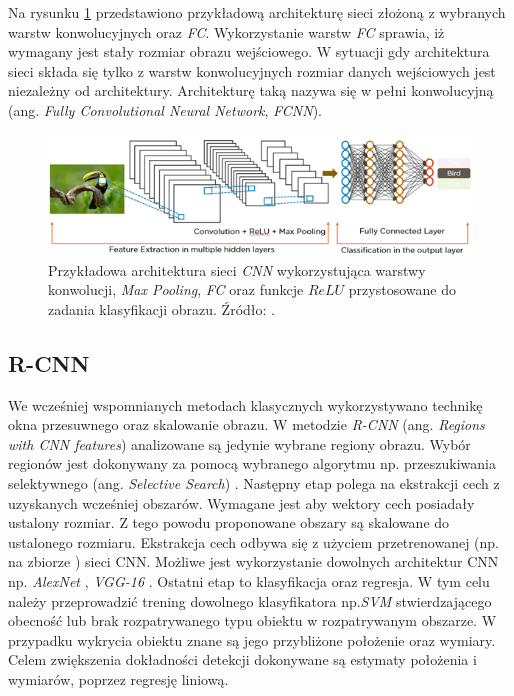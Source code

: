 Na rysunku \ref{fig:example_layers} przedstawiono przykładową architekturę sieci złożoną z wybranych warstw konwolucyjnych oraz \emph{FC}. 
Wykorzystanie warstw \emph{FC} sprawia, iż wymagany jest stały rozmiar obrazu wejściowego.
W sytuacji gdy architektura sieci składa się tylko z warstw konwolucyjnych rozmiar danych wejściowych jest niezależny od architektury. 
Architekturę taką nazywa się w pełni konwolucyjną (ang. \emph{Fully Convolutional Neural Network}, \emph{FCNN}).
\begin{figure}
    \centering
    \includegraphics[width=0.9\linewidth]{images/layers_.png}
    \caption{Przykładowa architektura sieci \emph{CNN} wykorzystująca warstwy konwolucji, \emph{Max Pooling}, \emph{FC} oraz funkcje $ReLU$ przystosowane do zadania klasyfikacji obrazu.
    Źródło: \cite{layers_types}.}
    \label{fig:example_layers}
\end{figure}
 

\subsection{R-CNN}

We wcześniej wspomnianych metodach klasycznych wykorzystywano technikę okna przesuwnego oraz skalowanie obrazu. 
W metodzie \emph{R-CNN} (ang. \emph{Regions with CNN features}) \cite{r_cnn} analizowane są jedynie wybrane regiony obrazu. 
Wybór regionów jest dokonywany za pomocą wybranego algorytmu np. przeszukiwania selektywnego (ang. \emph{Selective Search}) \cite{sel_search}.
Następny etap polega na ekstrakcji cech z uzyskanych wcześniej obszarów.
Wymagane jest aby wektory cech posiadały ustalony rozmiar. 
Z tego powodu proponowane obszary są skalowane do ustalonego rozmiaru.
Ekstrakcja cech odbywa się z użyciem przetrenowanej (np. na zbiorze \cite{imagenet}) sieci CNN.
Możliwe jest wykorzystanie dowolnych architektur CNN np. \emph{AlexNet} \cite{alexnet}, \emph{VGG-16} \cite{vgg} \cite{vgg}.
Ostatni etap to klasyfikacja oraz regresja.
W tym celu należy przeprowadzić trening dowolnego klasyfikatora np.\emph{SVM} stwierdzającego obecność lub brak rozpatrywanego typu obiektu w rozpatrywanym obszarze.
W przypadku wykrycia obiektu znane są jego przybliżone położenie oraz wymiary.
Celem zwiększenia dokładności detekcji dokonywane są estymaty położenia i wymiarów, poprzez regresję liniową.

